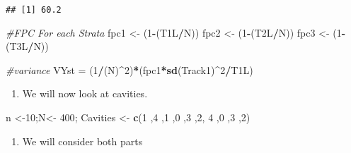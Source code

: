 \documentclass[
]{article}
\newenvironment{Shaded}{\begin{snugshade}}{\end{snugshade}}
\newcommand{\CommentTok}[1]{\textcolor[rgb]{0.56,0.35,0.01}{\textit{#1}}}
\newcommand{\DecValTok}[1]{\textcolor[rgb]{0.00,0.00,0.81}{#1}}
\newcommand{\KeywordTok}[1]{\textcolor[rgb]{0.13,0.29,0.53}{\textbf{#1}}}
\newcommand{\NormalTok}[1]{#1}
\newcommand{\OperatorTok}[1]{\textcolor[rgb]{0.81,0.36,0.00}{\textbf{#1}}}
\newcommand{\StringTok}[1]{\textcolor[rgb]{0.31,0.60,0.02}{#1}}
\providecommand{\tightlist}{%
  \setlength{\itemsep}{0pt}\setlength{\parskip}{0pt}}
\begin{document}
\begin{verbatim}
## [1] 60.2
\end{verbatim}

\begin{Shaded}
\begin{Highlighting}[]
\CommentTok{#FPC For each Strata}
\NormalTok{fpc1 <-}\StringTok{ }\NormalTok{(}\DecValTok{1}\OperatorTok{-}\NormalTok{(T1L}\OperatorTok{/}\NormalTok{N))}
\NormalTok{fpc2 <-}\StringTok{ }\NormalTok{(}\DecValTok{1}\OperatorTok{-}\NormalTok{(T2L}\OperatorTok{/}\NormalTok{N))}
\NormalTok{fpc3 <-}\StringTok{ }\NormalTok{(}\DecValTok{1}\OperatorTok{-}\NormalTok{(T3L}\OperatorTok{/}\NormalTok{N))}

\CommentTok{#variance }
\NormalTok{VYst =}\StringTok{ }\NormalTok{(}\DecValTok{1}\OperatorTok{/}\NormalTok{(N)}\OperatorTok{^}\DecValTok{2}\NormalTok{)}\OperatorTok{*}\NormalTok{(fpc1}\OperatorTok{*}\KeywordTok{sd}\NormalTok{(Track1)}\OperatorTok{^}\DecValTok{2}\OperatorTok{/}\NormalTok{T1L)}
\end{Highlighting}
\end{Shaded}

\begin{enumerate}
\def\labelenumi{\arabic{enumi}.}
\setcounter{enumi}{2}
\tightlist
\item
  We will now look at cavities.
\end{enumerate}

\begin{Shaded}
\begin{Highlighting}[]
\NormalTok{n <-}\DecValTok{10}\NormalTok{;N<-}\StringTok{ }\DecValTok{400}\NormalTok{;}
\NormalTok{Cavities <-}\StringTok{ }\KeywordTok{c}\NormalTok{(}\DecValTok{1}\NormalTok{ ,}\DecValTok{4}\NormalTok{ ,}\DecValTok{1}\NormalTok{ ,}\DecValTok{0}\NormalTok{ ,}\DecValTok{3}\NormalTok{ ,}\DecValTok{2}\NormalTok{, }\DecValTok{4}\NormalTok{ ,}\DecValTok{0}\NormalTok{ ,}\DecValTok{3}\NormalTok{ ,}\DecValTok{2}\NormalTok{)}
\end{Highlighting}
\end{Shaded}

\begin{enumerate}
\def\labelenumi{\arabic{enumi}.}
\setcounter{enumi}{3}
\tightlist
\item
  We will consider both parts
\end{enumerate}
\end{document}
